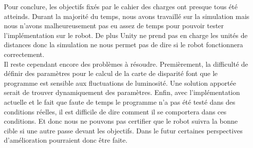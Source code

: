 \documentclass[12pt,a4paper]{report}
\begin{document}
Pour conclure, les objectifs fixés par le cahier des charges ont presque tous été atteinds. Durant la majorité du temps, nous avons travaillé sur la simulation mais nous n'avons malheureusement pas eu assez de temps pour pouvoir tester l'implémentation sur le robot. De plus Unity ne prend pas en charge les unités de distances donc la simulation ne  nous permet pas de dire si le robot fonctionnera correctement.\\
Il reste cependant encore des problèmes à résoudre. Premièrement, la difficulté de définir des paramètres pour le calcul de la carte de disparité font que le programme est sensible aux fluctuations de luminosité. Une solution apportée serait de trouver dynamiquement des paramètres. Enfin, avec l'implémentation actuelle et le fait que faute de temps le programme n'a pas été testé dans des conditions réelles, il est difficile de dire comment il se comportera dans ces conditions. Et donc nous ne pouvons pas certifier que le robot suivra la bonne cible si une autre passe devant les objectifs. Dans le futur certaines perspectives d'amélioration pourraient donc être faite.
\end{document}
